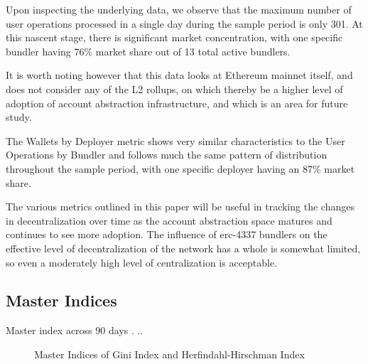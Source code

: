 \documentclass[conference]{IEEEtran}
\begin{document}
Upon inspecting the underlying data, we observe that the maximum number of user operations processed in a single day during the sample period is only 301.  At this nascent stage, there is significant market concentration, with one specific bundler having 76\% market share out of 13 total active bundlers.

It is worth noting however that this data looks at Ethereum mainnet itself, and does not consider any of the L2 rollups, on which thereby be a higher level of adoption of account abstraction infrastructure, and which is an area for future study.

The Wallets by Deployer metric shows very similar characteristics to the User Operations by Bundler and follows much the same pattern of distribution throughout the sample period, with one specific deployer having an 87\% market share.

The various metrics outlined in this paper will be useful in tracking the changes in decentralization over time as the account abstraction space matures and continues to see more adoption.  The influence of erc-4337 bundlers on the effective level of decentralization of the network has a whole is somewhat limited, so even a moderately high level of centralization is acceptable.

\subsection{Master Indices}

Master index across 90 days . .. 

\begin{figure}[ht]
    \centering
    \datatable
    \caption{Master Indices of Gini Index and Herfindahl-Hirschman Index}
    \label{fig:masterindices}
\end{figure}
\end{document}
